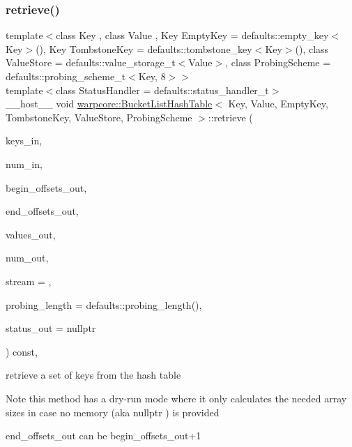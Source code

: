 \subsubsection{\texorpdfstring{retrieve()}{retrieve()}\hspace{0.1cm}{\footnotesize\ttfamily [2/2]}}
{\footnotesize\ttfamily template$<$class Key , class Value , Key Empty\+Key = defaults\+::empty\+\_\+key$<$\+Key$>$(), Key Tombstone\+Key = defaults\+::tombstone\+\_\+key$<$\+Key$>$(), class Value\+Store  = defaults\+::value\+\_\+storage\+\_\+t$<$\+Value$>$, class Probing\+Scheme  = defaults\+::probing\+\_\+scheme\+\_\+t$<$\+Key, 8$>$$>$ \\
template$<$class Status\+Handler  = defaults\+::status\+\_\+handler\+\_\+t$>$ \\
\+\_\+\+\_\+host\+\_\+\+\_\+ void \hyperlink{classwarpcore_1_1BucketListHashTable}{warpcore\+::\+Bucket\+List\+Hash\+Table}$<$ Key, Value, Empty\+Key, Tombstone\+Key, Value\+Store, Probing\+Scheme $>$\+::retrieve (\begin{DoxyParamCaption}\item[{const key\+\_\+type $\ast$const}]{keys\+\_\+in,  }\item[{const index\+\_\+type}]{num\+\_\+in,  }\item[{index\+\_\+type $\ast$const}]{begin\+\_\+offsets\+\_\+out,  }\item[{index\+\_\+type $\ast$const}]{end\+\_\+offsets\+\_\+out,  }\item[{value\+\_\+type $\ast$const}]{values\+\_\+out,  }\item[{index\+\_\+type \&}]{num\+\_\+out,  }\item[{const cuda\+Stream\+\_\+t}]{stream = {},  }\item[{const index\+\_\+type}]{probing\+\_\+length = {\ttfamily defaults\+:\+:probing\+\_\+length()},  }\item[{typename Status\+Handler\+::base\+\_\+type $\ast$const}]{status\+\_\+out = {\ttfamily nullptr} }\end{DoxyParamCaption}) const\hspace{0.3cm}{\ttfamily [inline]}, {\ttfamily [noexcept]}}



retrieve a set of keys from the hash table 

\begin{DoxyNote}{Note}
this method has a dry-\/run mode where it only calculates the needed array sizes in case no memory (aka {\ttfamily nullptr} ) is provided 

{\ttfamily end\+\_\+offsets\+\_\+out} can be {\ttfamily begin\+\_\+offsets\+\_\+out+1} 
\end{DoxyNote}

